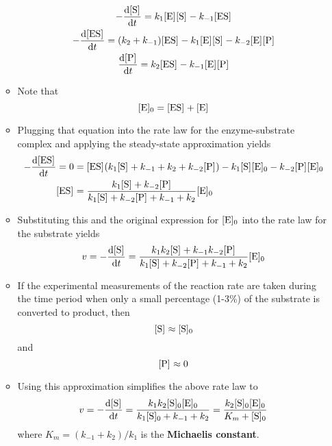 \documentclass[../notes.tex]{subfiles}
\begin{document}
\begin{itemize}
\begin{itemize}
\begin{gather*}
            -\dv{\cnc{S}}{t} = k_1\cnc{E}\cnc{S}-k_{-1}\cnc{ES}\\
            -\dv{\cnc{ES}}{t} = (k_2+k_{-1})\cnc{ES}-k_1\cnc{E}\cnc{S}-k_{-2}\cnc{E}\cnc{P}\\
            \dv{\cnc{P}}{t} = k_2\cnc{ES}-k_{-1}\cnc{E}\cnc{P}
        \end{gather*}
        \item Note that
        \begin{equation*}
            \cnc[0]{E} = \cnc{ES}+\cnc{E}
        \end{equation*}
        \item Plugging that equation into the rate law for the enzyme-substrate complex and applying the steady-state approximation yields
        \begin{align*}
            -\dv{\cnc{ES}}{t} = 0 &= \cnc{ES}(k_1\cnc{S}+k_{-1}+k_2+k_{-2}\cnc{P})-k_1\cnc{S}\cnc[0]{E}-k_{-2}\cnc{P}\cnc[0]{E}\\
            \cnc{ES} &= \frac{k_1\cnc{S}+k_{-2}\cnc{P}}{k_1\cnc{S}+k_{-2}\cnc{P}+k_{-1}+k_2}\cnc[0]{E}
        \end{align*}
        \item Substituting this and the original expression for $\cnc[0]{E}$ into the rate law for the substrate yields
        \begin{equation*}
            v = -\dv{\cnc{S}}{t}
            = \frac{k_1k_2\cnc{S}+k_{-1}k_{-2}\cnc{P}}{k_1\cnc{S}+k_{-2}\cnc{P}+k_{-1}+k_2}\cnc[0]{E}
        \end{equation*}
        \item If the experimental measurements of the reaction rate are taken during the time period when only a small percentage (1-3\%) of the substrate is converted to product, then
        \begin{equation*}
            \cnc{S} \approx \cnc[0]{S}
        \end{equation*}
        and
        \begin{equation*}
            \cnc{P} \approx 0
        \end{equation*}
        \item Using this approximation simplifies the above rate law to
        \begin{equation*}
            v = -\dv{\cnc{S}}{t}
            = \frac{k_1k_2\cnc[0]{S}\cnc[0]{E}}{k_1\cnc[0]{S}+k_{-1}+k_2}
            = \frac{k_2\cnc[0]{S}\cnc[0]{E}}{K_m+\cnc[0]{S}}
        \end{equation*}
        where $K_m=(k_{-1}+k_2)/k_1$ is the \textbf{Michaelis constant}.

\end{itemize}
\end{itemize}
\end{document}
